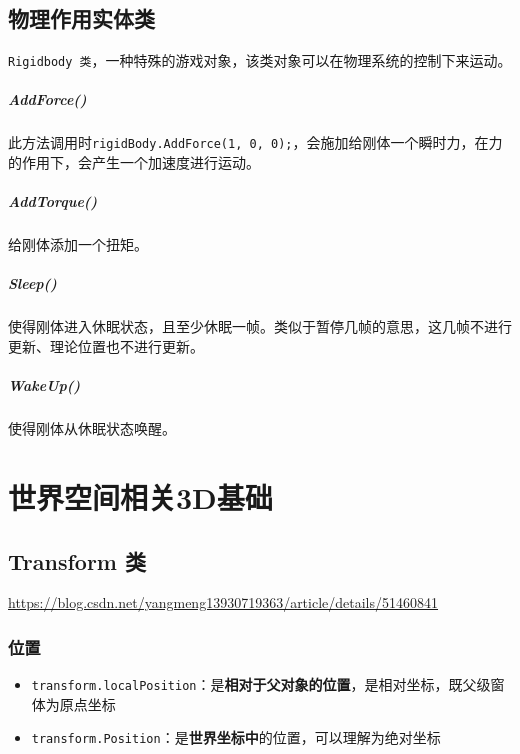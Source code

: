 \documentclass[UTF8,a4paper,12pt]{ctexbook}
\begin{document}
	\section{物理作用实体类} \verb|Rigidbody 类|，一种特殊的游戏对象，该类对象可以在物理系统的控制下来运动。
		\paragraph{AddForce()}
			此方法调用时\verb|rigidBody.AddForce(1, 0, 0);|，会施加给刚体一个瞬时力，在力的作用下，会产生一个加速度进行运动。
			
		\paragraph{AddTorque()}
			给刚体添加一个扭矩。
			
		\paragraph{Sleep()}
			使得刚体进入休眠状态，且至少休眠一帧。类似于暂停几帧的意思，这几帧不进行更新、理论位置也不进行更新。
			
		\paragraph{WakeUp()}
			使得刚体从休眠状态唤醒。
		
\chapter{世界空间相关3D基础}
	\section{Transform 类}
		\url{https://blog.csdn.net/yangmeng13930719363/article/details/51460841}
		\subsection{位置}
			\begin{itemize}
				\item \verb|transform.localPosition|：是\textbf{相对于父对象的位置}，是相对坐标，既父级窗体为原点坐标
				\item \verb|transform.Position|：是\textbf{世界坐标中}的位置，可以理解为绝对坐标
			\end{itemize}
\end{document}
